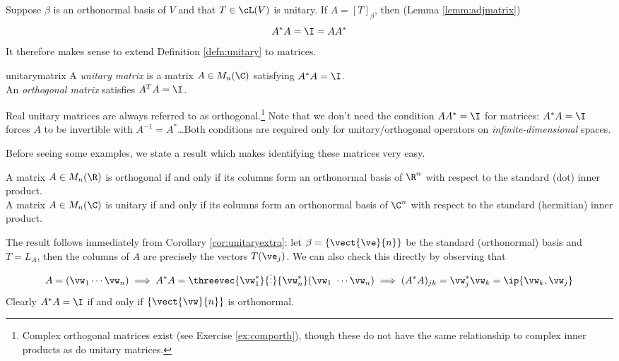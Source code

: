 Suppose $\beta$ is an orthonormal basis of $V$ and that $T\in\cL(V)$ is unitary. If $A=[T]_\beta$, then (Lemma \ref{lemm:adjmatrix})
\[A^*A=\I=AA^*\]
It therefore makes sense to extend Definition \ref{defn:unitary} to matrices.

\begin{defn}{}{unitarymatrix}
A \emph{unitary matrix} is a matrix $A\in M_n(\C)$ satisfying $A^*A=\I$.\\
An \emph{orthogonal matrix} satisfies $A^TA=\I$.
\end{defn}

Real unitary matrices are always referred to as orthogonal.\footnote{Complex orthogonal matrices exist (see Exercise \ref{ex:comporth}), though these do not have the same relationship to complex inner products as do unitary matrices.} Note that we don't need the condition $AA^*=\I$ for matrices: $A^*A=\I$ forces $A$ to be invertible with $A^{-1}=A^*$\ldots Both conditions are required only for unitary/orthogonal operators on \emph{infinite-dimensional} spaces.

Before seeing some examples, we state a result which makes identifying these matrices very easy.

\begin{cor}{}{}
A matrix $A\in M_n(\R)$ is orthogonal if and only if its columns form an orthonormal basis of $\R^n$ with respect to the standard (dot) inner product.\\[5pt]
A matrix $A\in M_n(\C)$ is unitary if and only if its columns form an orthonormal basis of $\C^n$ with respect to the standard (hermitian) inner product.
\end{cor}

The result follows immediately from Corollary \ref{cor:unitaryextra}: let $\beta=\{\vect{\ve}{n}\}$ be the standard (orthonormal) basis and $T=L_A$, then the columns of $A$ are precisely the vectors $T(\ve_j)$. We can also check this directly by observing that
\[A=(\vw_1\cdots\vw_n)\implies A^*A=\threevec{\vw_1^*}{\vdots}{\vw_n^*}(\vw_1\ \cdots \vw_n) \implies (A^*A)_{jk}=\vw_j^*\vw_k=\ip{\vw_k,\vw_j}\]
Clearly $A^*A=\I$ if and only if $\{\vect{\vw}{n}\}$ is orthonormal.

